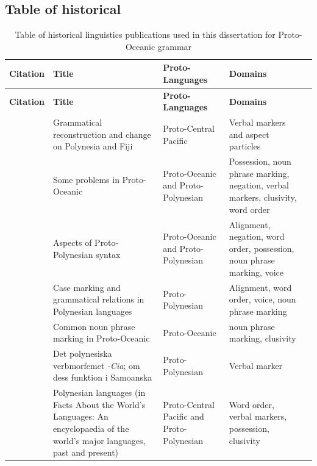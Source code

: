 \documentclass[a4paper,10pt]{article} %
\begin{document}
\subsection{Table of historical}
\label{supp:proto_lg_coding_table}

\begin{longtable}{|p{3cm}|  p{5cm}| p{4cm} | p{3cm}  | p{3cm} |}
\caption{{Table of historical linguistics publications used in this dissertation for Proto-Oceanic grammar}}
\label{HL_prediction_table_summary} \\
\hline
\textbf{Citation}  & \textbf{Title} & \textbf{Proto-Languages}  & \textbf{Domains} \\ \hline
\endfirsthead

\hline
\textbf{Citation}  & \textbf{Title} & \textbf{Proto-Languages}  & \textbf{Domains} \\ \hline
\endhead


\citet{pawley1970change} & Grammatical reconstruction and change on Polynesia and Fiji & Proto-Central Pacific  &Verbal markers and aspect particles \\ \hline

\citet{pawley1973some} & Some problems in Proto-Oceanic & Proto-Oceanic and Proto-Polynesian  & Possession, noun phrase marking, negation, verbal markers, clusivity, word order  \\ \hline

\citet{clark1976aspects} & Aspects of Proto-Polynesian syntax & Proto-Oceanic and Proto-Polynesian  & Alignment, negation, word order, possession, noun phrase marking, voice \\ \hline

\citet{chung1978}  & Case marking and grammatical relations in Polynesian languages & Proto-Polynesian  & Alignment, word order, voice, noun phrase marking \\ \hline

\citet{crowley1985common}  & Common noun phrase marking in Proto-Oceanic & Proto-Oceanic &  noun phrase marking, clusivity  \\ \hline

\citet{jonsson1998} & Det polynesiska verbmorfemet \emph{-Cia}; om dess funktion i Samoanska & Proto-Polynesian & Verbal marker \\ \hline

\citet{marck2000_encyclo} & Polynesian languages (in Facts About the World's Languages: An encyclopaedia of the world's major languages, past and present)& Proto-Central Pacific and Proto-Polynesian & Word order, verbal markers, possession, clusivity \\ \hline


\end{longtable}
\end{document}
